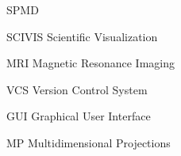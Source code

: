 \documentclass[cic,tc,english]{iiufrgs}
\begin{document}
\listoffigures

\listoftables

\begin{listofabbrv}{SPMD}
    \item[SCIVIS] Scientific Visualization
    \item[MRI] Magnetic Resonance Imaging
    \item[VCS] Version Control System
    \item[GUI] Graphical User Interface
    \item[MP] Multidimensional Projections
\end{listofabbrv}


\tableofcontents









  
  
  
  
  
  
  





%




\end{document}
